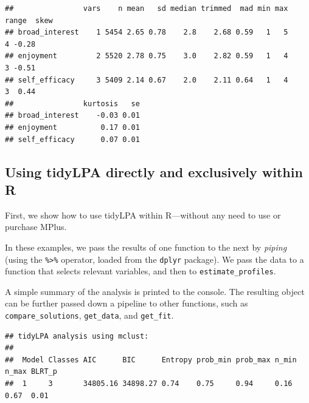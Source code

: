 \documentclass[man]{apa6}
\newenvironment{Shaded}{\begin{snugshade}}{\end{snugshade}}
\newcommand{\DecValTok}[1]{\textcolor[rgb]{0.00,0.00,0.81}{#1}}
\newcommand{\KeywordTok}[1]{\textcolor[rgb]{0.13,0.29,0.53}{\textbf{#1}}}
\newcommand{\NormalTok}[1]{#1}
\newcommand{\OperatorTok}[1]{\textcolor[rgb]{0.81,0.36,0.00}{\textbf{#1}}}
\newcommand{\StringTok}[1]{\textcolor[rgb]{0.31,0.60,0.02}{#1}}
\begin{document}
\begin{verbatim}
##                vars    n mean   sd median trimmed  mad min max range  skew
## broad_interest    1 5454 2.65 0.78    2.8    2.68 0.59   1   5     4 -0.28
## enjoyment         2 5520 2.78 0.75    3.0    2.82 0.59   1   4     3 -0.51
## self_efficacy     3 5409 2.14 0.67    2.0    2.11 0.64   1   4     3  0.44
##                kurtosis   se
## broad_interest    -0.03 0.01
## enjoyment          0.17 0.01
## self_efficacy      0.07 0.01
\end{verbatim}

\hypertarget{using-tidylpa-directly-and-exclusively-within-r}{%
\subsection{Using tidyLPA directly and exclusively within R}\label{using-tidylpa-directly-and-exclusively-within-r}}

First, we show how to use tidyLPA within R---without any need to use or purchase MPlus.

In these examples, we pass the results of one function to the next by \emph{piping}
(using the \texttt{\%\textgreater{}\%} operator, loaded from the \texttt{dplyr} package). We pass the data to
a function that selects relevant variables, and then to \texttt{estimate\_profiles}.

A simple summary of the analysis is printed to the console. The resulting object
can be further passed down a pipeline to other functions, such as
\texttt{compare\_solutions}, \texttt{get\_data}, and \texttt{get\_fit}.

\begin{Shaded}
\end{Shaded}

\begin{verbatim}
## tidyLPA analysis using mclust: 
## 
##  Model Classes AIC      BIC      Entropy prob_min prob_max n_min n_max BLRT_p
##  1     3       34805.16 34898.27 0.74    0.75     0.94     0.16  0.67  0.01
\end{verbatim}
\end{document}
